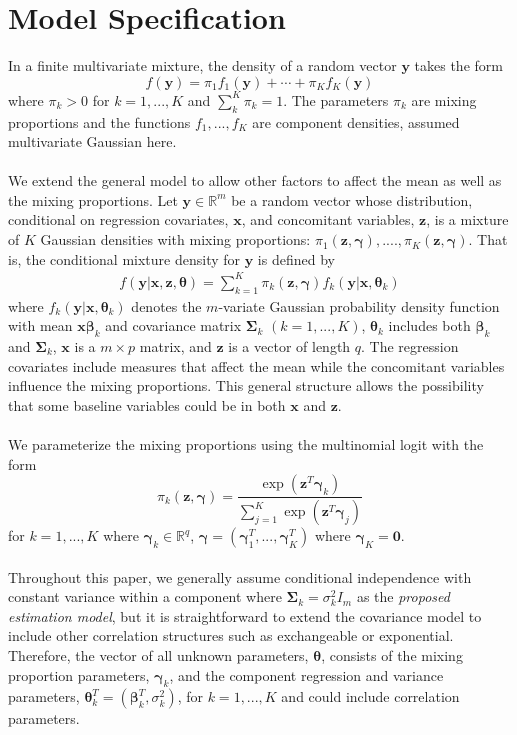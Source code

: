 \documentclass[10pt]{article}
\newcommand{\B}[0]{\mathbf}
\newcommand{\bs}[0]{\boldsymbol}
\begin{document}
\section{Model Specification}
In a finite multivariate mixture, the density of a random vector $\B y$ takes the form
$$f(\B y)=\pi_{1}f_{1}(\B y)+\cdots+\pi_{K}f_{K}(\B y)$$
where $\pi_{k}>0$ for $k=1,...,K$ and $\sum^{K}_{k}\pi_{k}=1$. The parameters $\pi_{k}$ are mixing proportions and the functions $f_{1},...,f_{K}$ are component densities, assumed multivariate Gaussian here. \\\\
We extend the general model to allow other factors to affect the mean as well as the mixing proportions. Let $\B y\in\mathbb{R}^{m}$ be a random vector whose distribution, conditional on regression covariates, $\B x$, and concomitant variables, $\B z$, is a mixture of $K$ Gaussian densities with mixing proportions: $\pi_{1}(\B z,\bs \gamma),....,\pi_{K}(\B z,\bs \gamma)$. That is, the conditional mixture density for $\B y$ is defined by
\begin{align}
f(\B y|\B x,\B z,\bs \theta)=\sum^{K}_{k=1}\pi_{k}(\B z,\bs\gamma)f_{k}(\B y|\B x,\bs\theta_{k}) \label{mixdens}
\end{align}
where $f_{k}(\B y|\B x,\bs\theta_{k})$ denotes the $m$-variate Gaussian probability density function with mean $\B x\bs \beta_{k}$ and covariance matrix $\bs\Sigma_{k}$ $(k=1,...,K)$, $\bs\theta_{k}$ includes both $\bs\beta_{k}$ and $\bs\Sigma_{k}$, $\B x$ is a $m\times p$ matrix, and $\B z$ is a vector of length $q$. The regression covariates include measures that affect the mean while the concomitant variables influence the mixing proportions. This general structure allows the possibility that some baseline variables could be in both $\B x$ and $\B z$. \\\\
We parameterize the mixing proportions using the multinomial logit with the form
$$\pi_{k}(\B z,\bs\gamma)=\frac{\exp(\B z^{T}\bs\gamma_{k})}{\sum_{j=1}^{K}\exp(\B z^{T}\bs\gamma_{j})}$$ 
for $k=1,...,K$ where $\bs \gamma_{k}\in\mathbb{R}^{q}$, $\bs\gamma = (\bs\gamma_1^T,...,\bs\gamma_K^T)$ where $\bs\gamma_{K}=\B 0$.\\\\
Throughout this paper, we generally assume conditional independence with constant variance within a component where $\B\Sigma_{k}=\sigma^{2}_{k}I_{m}$ as the {\em proposed estimation model}, but it is straightforward to extend the covariance model to include other correlation structures such as exchangeable or exponential. Therefore, the vector of all unknown parameters, $\bs\theta$, consists of the mixing proportion parameters, $\bs\gamma_{k}$, and the component regression and variance parameters, $\bs\theta^{T}_{k}=(\bs\beta^{T}_{k},\sigma^{2}_{k})$, for $k=1,...,K$ and could include correlation parameters.  
\end{document}
